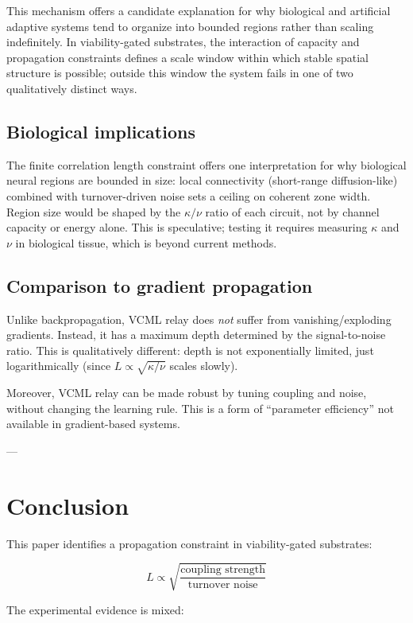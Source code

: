 \documentclass[11pt]{article}
\begin{document}
This mechanism offers a candidate explanation for why biological and artificial adaptive systems tend
to organize into bounded regions rather than scaling indefinitely. In viability-gated substrates,
the interaction of capacity and propagation constraints defines a scale window within which stable
spatial structure is possible; outside this window the system fails in one of two qualitatively
distinct ways.

\subsection{Biological implications}

The finite correlation length constraint offers one interpretation for why biological neural regions are bounded in size: local connectivity (short-range diffusion-like) combined with turnover-driven noise sets a ceiling on coherent zone width. Region size would be shaped by the $\kappa/\nu$ ratio of each circuit, not by channel capacity or energy alone. This is speculative; testing it requires measuring $\kappa$ and $\nu$ in biological tissue, which is beyond current methods.

\subsection{Comparison to gradient propagation}

Unlike backpropagation, VCML relay does \emph{not} suffer from vanishing/exploding gradients. Instead, it has a maximum depth determined by the signal-to-noise ratio. This is qualitatively different: depth is not exponentially limited, just logarithmically (since $L \propto \sqrt{\kappa/\nu}$ scales slowly).

Moreover, VCML relay can be made robust by tuning coupling and noise, without changing the learning rule. This is a form of ``parameter efficiency'' not available in gradient-based systems.

---

\section{Conclusion}

This paper identifies a propagation constraint in viability-gated substrates:

$$L \propto \sqrt{\frac{\text{coupling strength}}{\text{turnover noise}}}$$

The experimental evidence is mixed:
\end{document}
